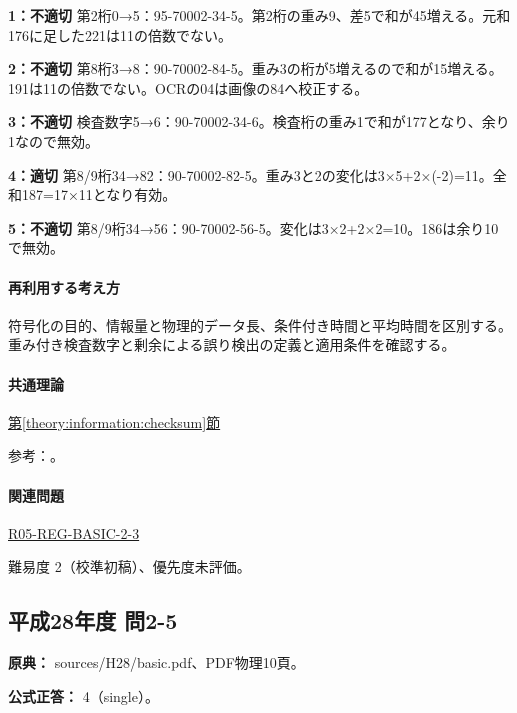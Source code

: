 \noindent\textbf{1：不適切} 第2桁0→5：95-70002-34-5。第2桁の重み9、差5で和が45増える。元和176に足した221は11の倍数でない。\par

\noindent\textbf{2：不適切} 第8桁3→8：90-70002-84-5。重み3の桁が5増えるので和が15増える。191は11の倍数でない。OCRの04は画像の84へ校正する。\par

\noindent\textbf{3：不適切} 検査数字5→6：90-70002-34-6。検査桁の重み1で和が177となり、余り1なので無効。\par

\noindent\textbf{4：適切} 第8/9桁34→82：90-70002-82-5。重み3と2の変化は3×5+2×(-2)=\allowbreak{}11。全和187=\allowbreak{}17×11となり有効。\par

\noindent\textbf{5：不適切} 第8/9桁34→56：90-70002-56-5。変化は3×2+2×2=\allowbreak{}10。186は余り10で無効。\par

\paragraph{再利用する考え方} 符号化の目的、情報量と物理的データ長、条件付き時間と平均時間を区別する。重み付き検査数字と剰余による誤り検出の定義と適用条件を確認する。

\paragraph{共通理論} \hyperref[theory:information:checksum]{第\ref*{theory:information:checksum}節}

\par 参考：\cite{info_errors}。

\paragraph{関連問題} \hyperref[q:r05-reg-basic-2-3]{R05-REG-BASIC-2-3}

\par 難易度 2（校準初稿）、優先度未評価。

\subsection{平成28年度 問2-5}
\label{q:h28-reg-basic-2-5}

\noindent\textbf{原典：} sources/H28/basic.pdf、PDF物理10頁。

\textbf{公式正答：} 4（single）。

